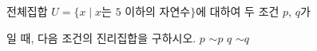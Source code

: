 전체집합 $U=\{x \mid x$는 $5$ 이하의 자연수$\}$에 대하여 두 조건 $p$, $q$가 \par\smallskip{}\par\smallskip\noindent 일 때, 다음 조건의 진리집합을 구하시오.
 $p$
 $\sim p$
 $q$
 $\sim q$
